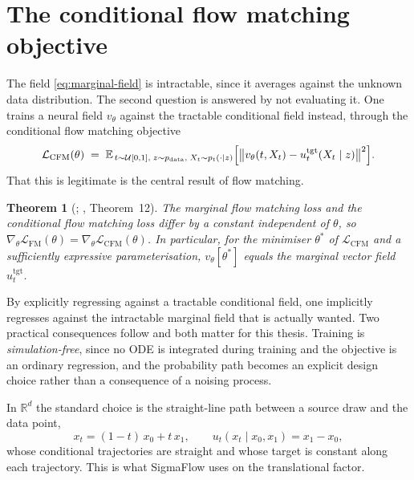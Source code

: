 \documentclass[11pt,a4paper]{report}
\theoremstyle{plain}
\newtheorem{theorem}{Theorem}[chapter]
\theoremstyle{definition}
\theoremstyle{remark}
\newcommand{\R}{\mathbb{R}}
\newcommand{\E}{\mathbb{E}}
\newcommand{\Loss}{\mathcal{L}}
\newcommand{\vfield}{u}
\newcommand{\pred}{v_\theta}
\begin{document}
\section{The conditional flow matching objective}

The field \eqref{eq:marginal-field} is intractable, since it averages against
the unknown data distribution. The second question is answered by not
evaluating it. One trains a neural field $\pred$ against the tractable
conditional field instead, through the conditional flow matching objective
\begin{equation}
  \Loss_{\mathrm{CFM}}(\theta)
  \;=\; \E_{\,t\sim\mathcal{U}[0,1],\; z\sim p_{\mathrm{data}},\;
             X_t \sim p_t(\cdot\mid z)}
    \Bigl[\bigl\| \pred(t, X_t) - \vfield_t^{\mathrm{tgt}}(X_t\mid z)\bigr\|^{2}\Bigr].
  \label{eq:cfm-loss}
\end{equation}
That this is legitimate is the central result of flow matching.

\begin{theorem}[\citealp{lipman2023flow}; \citealp{holderrieth2025flowmatching}, Theorem~12]
\label{thm:cfm}
The marginal flow matching loss and the conditional flow matching loss differ
by a constant independent of $\theta$, so
$\nabla_\theta \Loss_{\mathrm{FM}}(\theta)
 = \nabla_\theta \Loss_{\mathrm{CFM}}(\theta)$.
In particular, for the minimiser $\theta^{*}$ of $\Loss_{\mathrm{CFM}}$ and a
sufficiently expressive parameterisation, $\pred[\theta^{*}]$ equals the
marginal vector field $\vfield_t^{\mathrm{tgt}}$.
\end{theorem}

\noindent
By explicitly regressing against a tractable conditional field, one implicitly
regresses against the intractable marginal field that is actually wanted. Two
practical consequences follow and both matter for this thesis. Training is
\emph{simulation-free}, since no ODE is integrated during training and the
objective is an ordinary regression, and the probability path becomes an
explicit design choice rather than a consequence of a noising process.

In $\R^{d}$ the standard choice is the straight-line path between a source
draw and the data point,
\begin{equation}
  x_t = (1-t)\,x_0 + t\,x_1,
  \qquad
  \vfield_t(x_t \mid x_0, x_1) = x_1 - x_0 ,
  \label{eq:linear-path}
\end{equation}
whose conditional trajectories are straight and whose target is constant along
each trajectory. This is what SigmaFlow uses on the translational factor.
\end{document}
